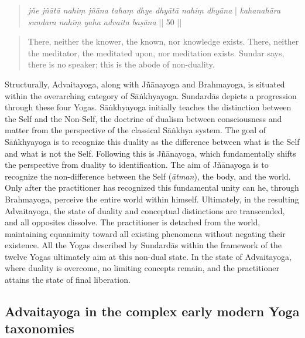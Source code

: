 \begin{quote}
\textit{jñe jñātā nahiṃ jñāna tahaṃ dhye dhyātā nahiṃ dhyāna} |
\textit{kahanahāra sundara nahīṃ yaha advaita baṣāna} || 50 || 
\end{quote}
\begin{quote}
There, neither the knower, the known, nor knowledge exists. There, neither the meditator, the meditated upon, nor meditation exists. Sundar says, there is no speaker; this is the abode of non-duality.
\end{quote}

Structurally, Advaitayoga, along with Jñānayoga and Brahmayoga, is situated within the overarching category of Sāṅkhyayoga. Sundardās depicts a progression through these four Yogas. Sāṅkhyayoga initially teaches the distinction between the Self and the Non-Self, the doctrine of dualism between consciousness and matter from the perspective of the classical Sāṅkhya system. The goal of Sāṅkhyayoga is to recognize this duality as the difference between what is the Self and what is not the Self. Following this is Jñānayoga, which fundamentally shifts the perspective from duality to identification. The aim of Jñānayoga is to recognize the non-difference between the Self (\textit{ātman}), the body, and the world. Only after the practitioner has recognized this fundamental unity can he, through Brahmayoga, perceive the entire world within himself. Ultimately, in the resulting Advaitayoga, the state of duality and conceptual distinctions are transcended, and all opposites dissolve. The practitioner is detached from the world, maintaining equanimity toward all existing phenomena without negating their existence. All the Yogas described by Sundardās within the framework of the twelve Yogas ultimately aim at this non-dual state. In the state of Advaitayoga, where duality is overcome, no limiting concepts remain, and the practitioner attains the state of final liberation.

\subsection{Advaitayoga in the complex early modern Yoga taxonomies}

